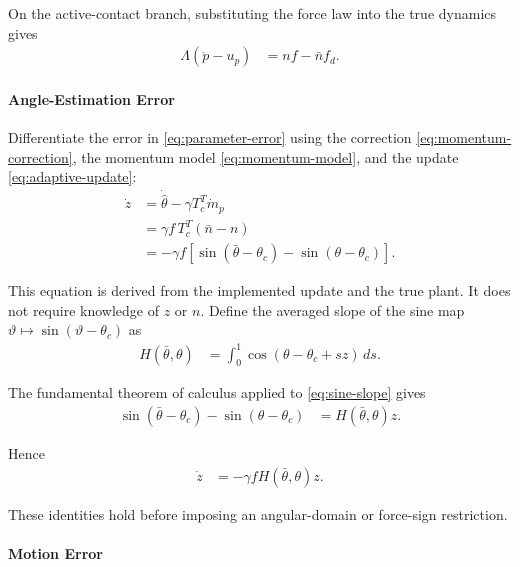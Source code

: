 \documentclass[10pt,journal,letterpaper]{IEEEtran}
\begin{document}
On the active-contact branch, substituting the force law into the true dynamics gives
\begin{equation}\label{eq:adaptive-closed-loop}
\begin{aligned}
\Lambda(\ddot p-u_p)&=nf-\bar n f_d.
\end{aligned}
\end{equation}

\paragraph{Angle-Estimation Error}

Differentiate the error in \eqref{eq:parameter-error} using the correction \eqref{eq:momentum-correction}, the momentum model \eqref{eq:momentum-model}, and the update \eqref{eq:adaptive-update}:
\begin{align*}
\dot z
&=\dot{\hat\theta}-\gamma T_c^T\dot m_p\\
&=\gamma f\,T_c^T(\bar n-n)\\
&=-\gamma f\left[
\sin(\bar\theta-\theta_c)-\sin(\theta-\theta_c)
\right].
\end{align*}

This equation is derived from the implemented update and the true plant. It does not require knowledge of $z$ or $n$. Define the averaged slope of the sine map $\vartheta\mapsto\sin(\vartheta-\theta_c)$ as
\begin{equation}\label{eq:sine-slope}
\begin{aligned}
H(\bar\theta,\theta)
&=\int_0^1\cos(\theta-\theta_c+s z)\,ds.
\end{aligned}
\end{equation}

The fundamental theorem of calculus applied to \eqref{eq:sine-slope} gives
\begin{align*}
\sin(\bar\theta-\theta_c)-\sin(\theta-\theta_c)&=H(\bar\theta,\theta)z.
\end{align*}

Hence
\begin{equation}\label{eq:parameter-error-dynamics}
\begin{aligned}
\dot z&=-\gamma fH(\bar\theta,\theta)z.
\end{aligned}
\end{equation}

These identities hold before imposing an angular-domain or force-sign restriction.

\paragraph{Motion Error}
\end{document}
